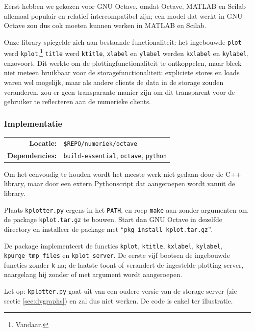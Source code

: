 \documentclass[a4paper]{article}
\begin{document}
Eerst hebben we gekozen voor \gls{GNU} Octave, omdat Octave, MATLAB en Scilab
allemaal populair en relatief intercompatibel zijn; een model dat werkt in
\gls{GNU} Octave zou dus ook moeten kunnen werken in MATLAB en Scilab.

Onze library spiegelde zich aan bestaande functionaliteit: het ingebouwde
{\tt plot} werd {\tt kplot},\footnote{Vandaar.} {\tt title} werd {\tt ktitle},
{\tt xlabel} en {\tt ylabel} werden {\tt kxlabel} en {\tt kylabel}, enzovoort.
Dit werkte om de plottingfunctionaliteit te ontkoppelen, maar bleek niet meteen
bruikbaar voor de storagefunctionaliteit: expliciete stores en loads waren wel
mogelijk, maar als andere clients de data in de storage zouden veranderen, zou
er geen transparante manier zijn om dit transparent voor de gebruiker te
reflecteren aan de numerieke clients.

\subsubsection{Implementatie}

\begin{tabular}{rl}
    {\bf Locatie:}      & {\tt \$REPO/numeriek/octave} \\
    {\bf Dependencies:} & {\tt build-essential}, {\tt octave}, {\tt python}
\end{tabular}

\vspace{.05in}

Om het eenvoudig te houden wordt het meeste werk niet gedaan door de C++
library, maar door een extern Pythonscript dat aangeroepen wordt vanuit de
library.

Plaats {\tt kplotter.py} ergens in het {\tt PATH}, en roep {\tt make} aan
zonder argumenten om de package {\tt kplot.tar.gz} te bouwen. Start dan
\gls{GNU} Octave in dezelfde directory en installeer de package met
``{\tt pkg install kplot.tar.gz}''.

De package implementeert de functies {\tt kplot}, {\tt ktitle}, {\tt kxlabel},
{\tt kylabel}, {\tt kpurge\_tmp\_files} en {\tt kplot\_server}. De eerste vijf
bootsen de ingebouwde functies zonder {\tt k} na; de laatste toont of verandert
de ingestelde plotting server, naargelang hij zonder of met argument wordt
aangeroepen.

Let op: {\tt kplotter.py} gaat uit van een oudere versie van de storage server
(zie sectie \ref{sec:dygraphs}) en zal dus niet werken. De code is enkel ter
illustratie. 
\end{document}
